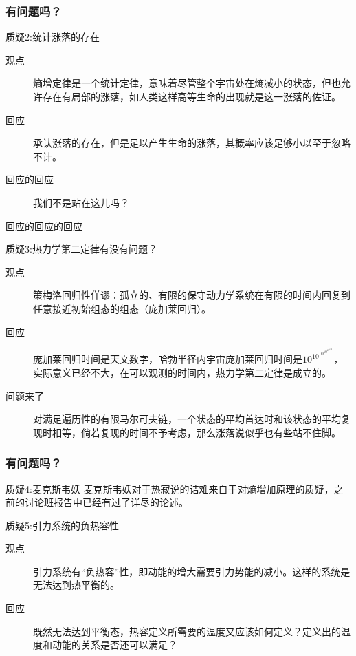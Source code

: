 \documentclass{if-beamer}
\begin{document}
\begin{frame}
    \frametitle{有问题吗？}
        \begin{block}{质疑2:统计涨落的存在}
            \begin{description}
                \item[观点]熵增定律是一个统计定律，意味着尽管整个宇宙处在熵减小的状态，但也允许存在有局部的涨落，如人类这样高等生命的出现就是这一涨落的佐证。
                \item[回应]承认涨落的存在，但是足以产生生命的涨落，其概率应该足够小以至于忽略不计。
                \item[回应的回应]我们不是站在这儿吗？
                \item[回应的回应的回应] 
            \end{description}
        \end{block}
        \begin{exampleblock}{质疑3:热力学第二定律有没有问题？}
            \begin{description}
                \item[观点]策梅洛回归性佯谬：孤立的、有限的保守动力学系统在有限的时间内回复到任意接近初始组态的组态（庞加莱回归）。
                \item[回应]庞加莱回归时间是天文数字，哈勃半径内宇宙庞加莱回归时间是$10^{{10}^{{10}^{{10}^{{10}^{{122}}}}}}$，实际意义已经不大，在可以观测的时间内，热力学第二定律是成立的。
                \item[问题来了]对满足遍历性的有限马尔可夫链，一个状态的平均首达时和该状态的平均复现时相等，倘若复现的时间不予考虑，那么涨落说似乎也有些站不住脚。
            \end{description}
        \end{exampleblock}


\end{frame}
\begin{frame}
    \frametitle{有问题吗？}
    \begin{exampleblock}{质疑4:麦克斯韦妖}
        麦克斯韦妖对于热寂说的诘难来自于对熵增加原理的质疑，之前的讨论班报告中已经有过了详尽的论述。
    \end{exampleblock}
    
        \begin{block}{质疑5:引力系统的负热容性}
            \begin{description}
                \item[观点]引力系统有“负热容”性，即动能的增大需要引力势能的减小。这样的系统是无法达到热平衡的。
                \item[回应]既然无法达到平衡态，热容定义所需要的温度又应该如何定义？定义出的温度和动能的关系是否还可以满足？
            \end{description}
        \end{block}
        
        
       


\end{frame}
\end{document}
